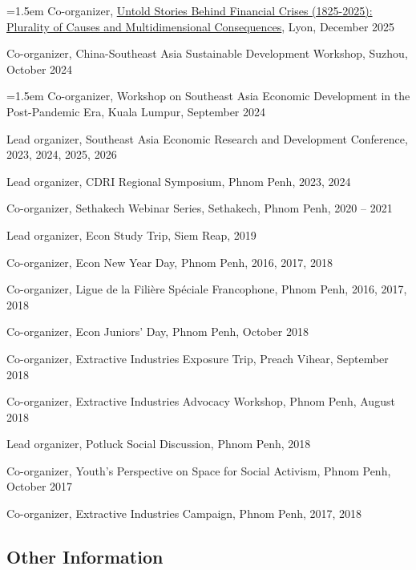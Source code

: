 \documentclass[10pt,a4paper]{article}
\begin{document}
\hangindent=1.5em
Co-organizer, \href{https://ysi.ineteconomics.org/event/the-untold-stories-behind-financial-crises-1825-2025-plurality-of-causes-and-multidimensional-consequences/}{Untold Stories Behind Financial Crises (1825-2025): Plurality of Causes and Multidimensional Consequences}, Lyon, December 2025

Co-organizer, China-Southeast Asia Sustainable Development Workshop, Suzhou, October 2024

\hangindent=1.5em
Co-organizer, Workshop on Southeast Asia Economic Development in the Post-Pandemic Era, Kuala Lumpur, September 2024

Lead organizer, Southeast Asia Economic Research and Development Conference, 2023, 2024, 2025, 2026

Lead organizer, CDRI Regional Symposium, Phnom Penh, 2023, 2024

Co-organizer, Sethakech Webinar Series, Sethakech, Phnom Penh, 2020 -- 2021

Lead organizer, Econ Study Trip, Siem Reap, 2019

Co-organizer, Econ New Year Day, Phnom Penh, 2016, 2017, 2018

Co-organizer, Ligue de la Filière Spéciale Francophone, Phnom Penh, 2016, 2017, 2018

Co-organizer, Econ Juniors' Day, Phnom Penh, October 2018

Co-organizer, Extractive Industries Exposure Trip, Preach Vihear, September 2018

Co-organizer, Extractive Industries Advocacy Workshop, Phnom Penh, August 2018

Lead organizer, Potluck Social Discussion, Phnom Penh, 2018

Co-organizer, Youth's Perspective on Space for Social Activism, Phnom Penh, October 2017

Co-organizer, Extractive Industries Campaign, Phnom Penh, 2017, 2018



\subsection*{Other Information}
\end{document}
